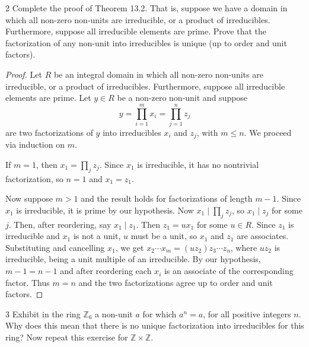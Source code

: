 \newpage

\begin{problem}{2}
    Complete the proof of Theorem 13.2.
    That is, suppose we have a domain in which all non-zero non-units are irreducible,
        or a product of irreducibles. Furthermore, suppose all irreducible elements 
        are prime. Prove that the factorization of any non-unit into irreducibles is unique
        (up to order and unit factors).
\end{problem}
\solved

\begin{proof}
    Let $R$ be an integral domain in which all non-zero non-units are irreducible,
        or a product of irreducibles.
    Furthermore, suppose all irreducible elements are prime.
    Let $y \in R$ be a non-zero non-unit and suppose
    \[
        y = \prod_{i=1}^{m} x_i = \prod_{j=1}^{n} z_j
    \]
    are two factorizations of $y$ into irreducibles $x_i$ and $z_j$,
        with $m \le n$.
    We proceed via induction on $m$.

    If $m = 1$, then $x_1 = \prod_j z_j$.
    Since $x_1$ is irreducible, it has no nontrivial factorization,
        so $n = 1$ and $x_1 = z_1$.

    Now suppose $m > 1$ and the result holds for factorizations
        of length $m - 1$.
    Since $x_1$ is irreducible, it is prime by our hypothesis.
    Now $x_1 \mid \prod_j z_j$, so $x_1 \mid z_j$ for some $j$.
    Then, after reordering, say $x_1 \mid z_1$.
    Then $z_1 = u x_1$ for some $u \in R$.
    Since $z_1$ is irreducible and $x_1$ is not a unit,
        $u$ must be a unit, so $x_1$ and $z_1$ are associates.
    Substituting and cancelling $x_1$, we get $x_2 \cdots x_m = (u z_2) z_3 \cdots z_n$,
    where $u z_2$ is irreducible, being a unit multiple of an irreducible.
    By our hypothesis, $m - 1 = n - 1$ and after reordering
        each $x_i$ is an associate of the corresponding factor.
    Thus $m = n$ and the two factorizations agree up to order
        and unit factors.
\end{proof}

\begin{problem}{3}
    Exhibit in the ring $\mathbb{Z}_6$ a non-unit $a$ for which $a^n = a$,
        for all positive integers $n$. Why does this mean that there is 
        no unique factorization into irreducibles for this ring? 
    Now repeat this exercise for $\mathbb{Z} \times \mathbb{Z}$.
\end{problem}
\solved

